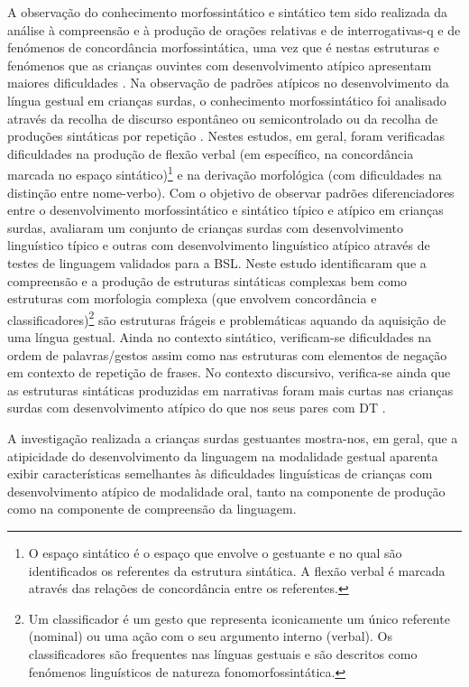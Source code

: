 \documentclass[output=paper,colorlinks,citecolor=brown,booklanguage=portuguese]{langscibook}
\begin{document}
\largerpage
A observação do conhecimento morfossintático e sintático tem sido realizada da análise à compreensão e à produção de orações relativas e de interrogativas-q e de fenómenos de concordância morfossintática, uma vez que é nestas estruturas e fenómenos que as crianças ouvintes com desenvolvimento atípico apresentam maiores dificuldades \citep{Martins2017}. Na observação de padrões atípicos no desenvolvimento da língua gestual em crianças surdas, o conhecimento morfossintático foi analisado através da recolha de discurso espontâneo ou semicontrolado \citep{Herman2014, QuintoPozos2013, QuintoPozos2011} ou da recolha de produções sintáticas por repetição  \citep{Marshall2015, Morgan2007}. Nestes estudos, em geral, foram verificadas dificuldades na produção de flexão verbal (em específico, na concordância marcada no espaço sintático)\footnote{O espaço sintático é o espaço que envolve o gestuante e no qual são identificados os referentes da estrutura sintática. A flexão verbal é marcada através das relações de concordância entre os referentes.} e na derivação morfológica (com dificuldades na distinção entre nome-verbo). Com o objetivo de observar padrões diferenciadores entre o desenvolvimento morfossintático e sintático típico e atípico em crianças surdas, \citet{Mason2010} avaliaram um conjunto de crianças surdas com desenvolvimento linguístico típico e outras com desenvolvimento linguístico atípico através de testes de linguagem validados para a BSL. Neste estudo identificaram que a compreensão e a produção de estruturas sintáticas complexas bem como estruturas com morfologia complexa (que envolvem concordância e classificadores)\footnote{Um classificador é um gesto que representa iconicamente um único referente (nominal) ou uma ação com o seu argumento interno (verbal). Os classificadores são frequentes nas línguas gestuais e são descritos como fenómenos linguísticos de natureza fonomorfossintática.} são estruturas frágeis e problemáticas aquando da aquisição de uma língua gestual. Ainda no contexto sintático, verificam-se dificuldades na ordem de palavras/gestos assim como nas estruturas com elementos de negação em contexto de repetição de frases. No contexto discursivo, verifica-se ainda que as estruturas sintáticas produzidas em narrativas foram mais curtas nas crianças surdas com desenvolvimento atípico do que nos seus pares com DT \citep{Herman2014}.

A investigação realizada a crianças surdas gestuantes mostra-nos, em geral, que a atipicidade do desenvolvimento da linguagem na modalidade gestual aparenta exibir características semelhantes às dificuldades linguísticas de crianças com desenvolvimento atípico de modalidade oral, tanto na componente de produção como na componente de compreensão da linguagem. 
\end{document}
